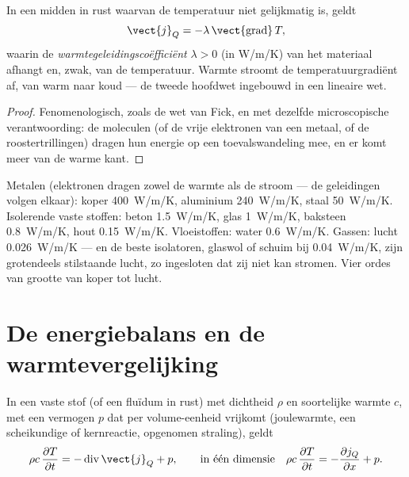 \begin{theorem}\label{thm:b2:heat-conduction:fourier}
In een midden in rust waarvan de temperatuur niet gelijkmatig is, geldt
\[
\vect{j}_Q = -\lambda\,\vect{\operatorname{grad}}\,T ,
\]
waarin de \emph{warmtegeleidingscoëfficiënt}
$\lambda > 0$ (in \unit{W/m/K}) van het materiaal afhangt en, zwak, van
de temperatuur. Warmte stroomt de temperatuurgradiënt af, van warm naar
koud --- de tweede hoofdwet ingebouwd in een lineaire wet.
\end{theorem}

\begin{proof}
Fenomenologisch, zoals de wet van Fick, en met dezelfde microscopische
verantwoording: de moleculen (of de vrije elektronen van een metaal, of de
roostertrillingen) dragen hun energie op een toevalswandeling mee, en er
komt meer van de warme kant.
\end{proof}

\begin{example}[Geleidingscoëfficiënten]\label{ex:b2:heat-conduction:values}
Metalen (elektronen dragen zowel de warmte als de stroom ---
de geleidingen volgen elkaar): koper \qty{400}{W/m/K}, aluminium
\qty{240}{W/m/K}, staal \qty{50}{W/m/K}. Isolerende vaste stoffen: beton
\qty{1.5}{W/m/K}, glas \qty{1}{W/m/K}, baksteen \qty{0.8}{W/m/K}, hout
\qty{0.15}{W/m/K}. Vloeistoffen: water \qty{0.6}{W/m/K}. Gassen: lucht
\qty{0.026}{W/m/K} --- en de beste isolatoren, glaswol of schuim bij
\qty{0.04}{W/m/K}, zijn grotendeels stilstaande lucht, zo ingesloten dat zij niet
kan stromen. Vier ordes van grootte van koper tot lucht.
\end{example}

\section{De energiebalans en de warmtevergelijking}

\begin{theorem}\label{thm:b2:heat-conduction:balance}
In een vaste stof (of een fluïdum in rust) met dichtheid $\rho$ en
soortelijke warmte
$c$, met een vermogen $p$ dat per volume-eenheid vrijkomt (joulewarmte, een
scheikundige of kernreactie, opgenomen straling), geldt
\[
\rho c\,\frac{\partial T}{\partial t} = -\operatorname{div}\vect{j}_Q + p ,
\qquad\text{in één dimensie}\quad
\rho c\,\frac{\partial T}{\partial t} = -\frac{\partial j_Q}{\partial x} + p .
\]
\end{theorem}

